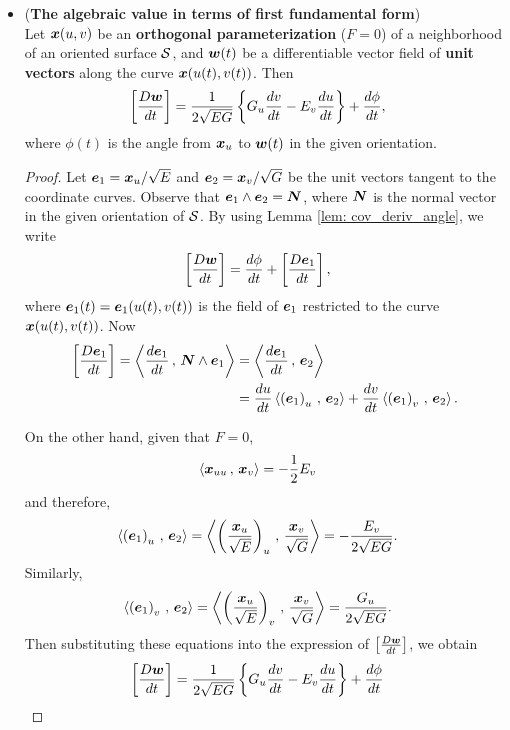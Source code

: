 \documentclass[11pt]{article}
\begin{document}
\begin{itemize}
\item \begin{proposition}\label{prop: alg_value_angle} (\textbf{The algebraic value in terms of first fundamental form})\\
Let $\boldsymbol{x}(u,v)$ be an \textbf{orthogonal parameterization} ($F=0$) of a neighborhood of an oriented surface ${\mathcal S}$, and $\boldsymbol{w}(t)$ be a differentiable vector field of \textbf{unit vectors} along the curve $\boldsymbol{x}(u(t), v(t))$. Then 
\begin{align}
\left[\frac{D\boldsymbol{w}}{dt}\right] &= \frac{1}{2\sqrt{EG}}\left\{G_{u}\frac{dv}{dt} - E_{v}\frac{du}{dt} \right\} +  \frac{d\phi}{dt}, \label{eqn: algebraic_value_first_fundamental_form}
\end{align}
where $\phi(t)$ is the angle from $\boldsymbol{x}_{u}$ to $\boldsymbol{w}(t)$ in the given orientation. 
\end{proposition}
\begin{proof}
Let $\boldsymbol{e}_{1} = \boldsymbol{x}_{u}/\sqrt{E}$ and $\boldsymbol{e}_{2} = \boldsymbol{x}_{v}/\sqrt{G}$ be the unit vectors tangent to the coordinate curves. Observe that $\boldsymbol{e}_{1} \wedge \boldsymbol{e}_{2} = \boldsymbol{N}$, where $\boldsymbol{N}$ is the normal vector in the given orientation of ${\mathcal S}$. By using Lemma \eqref{lem: cov_deriv_angle}, we write
\begin{align*}
\left[\frac{D\boldsymbol{w}}{dt}\right] &=  \frac{d\phi}{dt} + \left[\frac{D\boldsymbol{e}_{1}}{dt}\right], 
\end{align*}
where $\boldsymbol{e}_{1}(t) = \boldsymbol{e}_{1}(u(t), v(t))$ is the field of $\boldsymbol{e}_{1}$ restricted to the curve $\boldsymbol{x}(u(t), v(t))$. Now 
\begin{align*}
\left[\frac{D\boldsymbol{e}_{1}}{dt}\right] = \left\langle \frac{d\boldsymbol{e}_{1}}{dt}\,,\,  \boldsymbol{N}\wedge \boldsymbol{e}_{1}  \right\rangle
&=  \left\langle \frac{d\boldsymbol{e}_{1}}{dt}\,,\, \boldsymbol{e}_{2}  \right\rangle\\
&= \frac{du}{dt}\left\langle \left(\boldsymbol{e}_{1}\right)_{u}\,,\, \boldsymbol{e}_{2} \right\rangle + \frac{dv}{dt}\left\langle \left(\boldsymbol{e}_{1}\right)_{v}\,,\, \boldsymbol{e}_{2} \right\rangle.
\end{align*}

On the other hand, given that $F=0$, 
\begin{align*}
\left\langle \boldsymbol{x}_{uu}\,,\, \boldsymbol{x}_{v} \right\rangle &= -\frac{1}{2}E_{v}
\end{align*}
and therefore,
\begin{align*}
\left\langle \left(\boldsymbol{e}_{1}\right)_{u}\,,\, \boldsymbol{e}_{2} \right\rangle &= \left\langle \left(\frac{\boldsymbol{x}_{u}}{\sqrt{E}}\right)_{u}\,,\, \frac{\boldsymbol{x}_{v}}{\sqrt{G}} \right\rangle
= -\frac{E_{v}}{2\sqrt{EG}}.
\end{align*}
Similarly, 
\begin{align*}
\left\langle \left(\boldsymbol{e}_{1}\right)_{v}\,,\, \boldsymbol{e}_{2} \right\rangle &= \left\langle \left(\frac{\boldsymbol{x}_{u}}{\sqrt{E}}\right)_{v}\,,\, \frac{\boldsymbol{x}_{v}}{\sqrt{G}} \right\rangle
= \frac{G_{u}}{2\sqrt{EG}}.
\end{align*}
Then substituting these equations into the expression of $\left[\frac{D\boldsymbol{w}}{dt}\right] $, we obtain
\begin{align*}
\left[\frac{D\boldsymbol{w}}{dt}\right] &=  \frac{1}{2\sqrt{EG}} \left\{G_{u}\frac{dv}{dt}  -E_{v}\frac{du}{dt} \right\} +\frac{d\phi}{dt} 
\end{align*} \QEDA
\end{proof}


\end{itemize}
\end{document}
